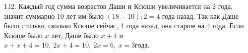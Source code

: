 112. Каждый год сумма возрастов Даши и Ксюши увеличивается на 2 года, значит суммарно 10 лет им было $(18-10):2=4$ года назад. Так как Даше было столько, сколько Ксюше сейчас, 4 года назад, она старше на 4 года. Если Ксюше было $x$ лет, Даше было $x+4$ и $x+x+4=10,\ 2x+4=10,\ 2x=6,\ x=3$года.\\
